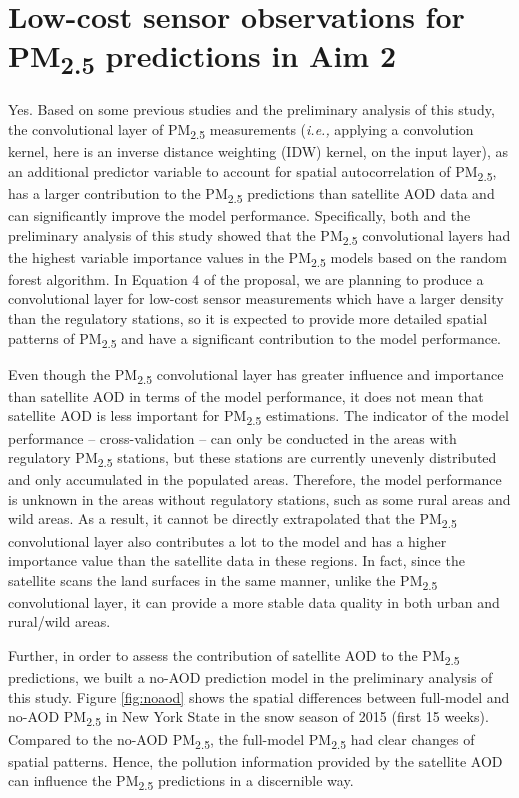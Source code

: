 \documentclass[11pt]{article}
\newcommand{\tsub}{\textsubscript}
\begin{document}
\section{Low-cost sensor observations for \texorpdfstring{PM\tsub{2.5}}{PM2.5} predictions in Aim 2}
\begin{enumerate*}[{[a)]}]
    \item Yes. Based on some previous studies \citep{hu2017estimating, di2016assessing} and the preliminary analysis of this study, the convolutional layer of PM\tsub{2.5} measurements (\textit{i.e.,} applying a convolution kernel, here is an inverse distance weighting (IDW) kernel, on the input layer), as an additional predictor variable to account for spatial autocorrelation of PM\tsub{2.5}, has a larger contribution to the PM\tsub{2.5} predictions than satellite AOD data and can significantly improve the model performance. Specifically, both \citet{hu2017estimating} and the preliminary analysis of this study showed that the PM\tsub{2.5} convolutional layers had the highest variable importance values in the PM\tsub{2.5} models based on the random forest algorithm. In Equation 4 of the proposal, we are planning to produce a convolutional layer for low-cost sensor measurements which have a larger density than the regulatory stations, so it is expected to provide more detailed spatial patterns of PM\tsub{2.5} and have a significant contribution to the model performance. 
    
    \item Even though the PM\tsub{2.5} convolutional layer has greater influence and importance than satellite AOD in terms of the model performance, it does not mean that satellite AOD is less important for PM\tsub{2.5} estimations. The indicator of the model performance -- cross-validation -- can only be conducted in the areas with regulatory PM\tsub{2.5} stations, but these stations are currently unevenly distributed and only accumulated in the populated areas. Therefore, the model performance is unknown in the areas without regulatory stations, such as some rural areas and wild areas. As a result, it cannot be directly extrapolated that the PM\tsub{2.5} convolutional layer also contributes a lot to the model and has a higher importance value than the satellite data in these regions. In fact, since the satellite scans the land surfaces in the same manner, unlike the PM\tsub{2.5} convolutional layer, it can provide a more stable data quality in both urban and rural/wild areas. 
    
    Further, in order to assess the contribution of satellite AOD to the PM\tsub{2.5} predictions, we built a no-AOD prediction model in the preliminary analysis of this study. Figure \ref{fig:noaod} shows the spatial differences between full-model and no-AOD PM\tsub{2.5} in New York State in the snow season of 2015 (first 15 weeks). Compared to the no-AOD PM\tsub{2.5}, the full-model PM\tsub{2.5} had clear changes of spatial patterns. Hence, the pollution information provided by the satellite AOD can influence the PM\tsub{2.5} predictions in a discernible way. 
    

\end{enumerate*}
\end{document}
